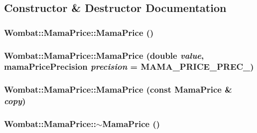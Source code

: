 \subsection{Constructor \& Destructor Documentation}
\hypertarget{classWombat_1_1MamaPrice_ab210daeb0aac1ceee25ff8b007d6790f}{
\subsubsection[{MamaPrice}]{\setlength{\rightskip}{0pt plus 5cm}Wombat::MamaPrice::MamaPrice ()}}
\label{classWombat_1_1MamaPrice_ab210daeb0aac1ceee25ff8b007d6790f}
\hypertarget{classWombat_1_1MamaPrice_a85764a87c09a9aeca5bfacb41f834806}{
\subsubsection[{MamaPrice}]{\setlength{\rightskip}{0pt plus 5cm}Wombat::MamaPrice::MamaPrice (double {\em value}, \/  mamaPricePrecision {\em precision} = {\ttfamily MAMA\_\-PRICE\_\-PREC\_})}}
\label{classWombat_1_1MamaPrice_a85764a87c09a9aeca5bfacb41f834806}
\hypertarget{classWombat_1_1MamaPrice_ab355672c720b562a23f51405eeacfe83}{
\subsubsection[{MamaPrice}]{\setlength{\rightskip}{0pt plus 5cm}Wombat::MamaPrice::MamaPrice (const {\bf MamaPrice} \& {\em copy})}}
\label{classWombat_1_1MamaPrice_ab355672c720b562a23f51405eeacfe83}
\hypertarget{classWombat_1_1MamaPrice_a228ecc4b339282a4f0e8ddde42a7bfb1}{
\subsubsection[{$\sim$MamaPrice}]{\setlength{\rightskip}{0pt plus 5cm}Wombat::MamaPrice::$\sim$MamaPrice ()}}
\label{classWombat_1_1MamaPrice_a228ecc4b339282a4f0e8ddde42a7bfb1}


